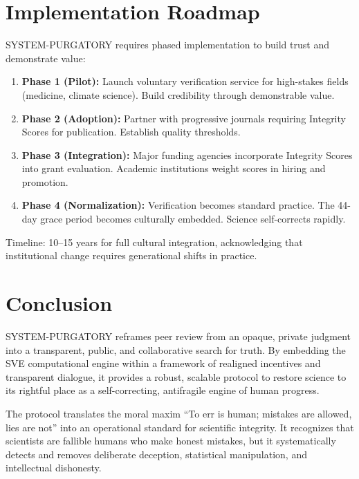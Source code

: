\documentclass[11pt,a4paper]{article}
\begin{document}
\section{Implementation Roadmap}
SYSTEM-PURGATORY requires phased implementation to build trust and demonstrate value:

\begin{enumerate}
    \item \textbf{Phase 1 (Pilot):} Launch voluntary verification service for high-stakes fields (medicine, climate science). Build credibility through demonstrable value.
    
    \item \textbf{Phase 2 (Adoption):} Partner with progressive journals requiring Integrity Scores for publication. Establish quality thresholds.
    
    \item \textbf{Phase 3 (Integration):} Major funding agencies incorporate Integrity Scores into grant evaluation. Academic institutions weight scores in hiring and promotion.
    
    \item \textbf{Phase 4 (Normalization):} Verification becomes standard practice. The 44-day grace period becomes culturally embedded. Science self-corrects rapidly.
\end{enumerate}

Timeline: 10--15 years for full cultural integration, acknowledging that institutional change requires generational shifts in practice.

\section{Conclusion}
SYSTEM-PURGATORY reframes peer review from an opaque, private judgment into a transparent, public, and collaborative search for truth. By embedding the SVE computational engine within a framework of realigned incentives and transparent dialogue, it provides a robust, scalable protocol to restore science to its rightful place as a self-correcting, antifragile engine of human progress.

The protocol translates the moral maxim ``To err is human; mistakes are allowed, lies are not'' into an operational standard for scientific integrity. It recognizes that scientists are fallible humans who make honest mistakes, but it systematically detects and removes deliberate deception, statistical manipulation, and intellectual dishonesty.
\end{document}
